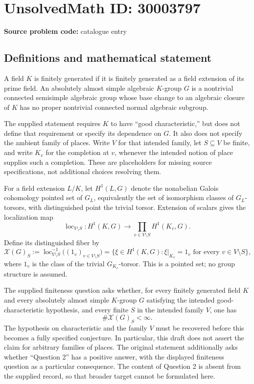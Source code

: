 \documentclass[11pt]{article}
\begin{document}
\section*{UnsolvedMath ID: 30003797}
\textbf{Source problem code:} catalogue entry
\subsection{Definitions and mathematical statement}
A field \(K\) is finitely generated if it is finitely generated as a field extension of its prime field. An absolutely almost simple algebraic \(K\)-group \(G\) is a nontrivial connected semisimple algebraic group whose base change to an algebraic closure of \(K\) has no proper nontrivial connected normal algebraic subgroup.

The supplied statement requires \(K\) to have ``good characteristic,'' but does not define that requirement or specify its dependence on \(G\). It also does not specify the ambient family of places. Write \(V\) for that intended family, let \(S\subseteq V\) be finite, and write \(K_v\) for the completion at \(v\), whenever the intended notion of place supplies such a completion. These are placeholders for missing source specifications, not additional choices resolving them.

For a field extension \(L/K\), let \(H^1(L,G)\) denote the nonabelian Galois cohomology pointed set of \(G_L\), equivalently the set of isomorphism classes of \(G_L\)-torsors, with distinguished point the trivial torsor. Extension of scalars gives the localization map
\[
\operatorname{loc}_{V\setminus S}\colon H^1(K,G)\longrightarrow\prod_{v\in V\setminus S}H^1(K_v,G).
\]
Define its distinguished fiber by
\[
\mathcal{X}(G)_S
:=\operatorname{loc}_{V\setminus S}^{-1}\bigl((1_v)_{v\in V\setminus S}\bigr)
=\bigl\{\xi\in H^1(K,G):\xi|_{K_v}=1_v\text{ for every }v\in V\setminus S\bigr\},
\]
where \(1_v\) is the class of the trivial \(G_{K_v}\)-torsor. This is a pointed set; no group structure is assumed.

The supplied finiteness question asks whether, for every finitely generated field \(K\) and every absolutely almost simple \(K\)-group \(G\) satisfying the intended good-characteristic hypothesis, and every finite \(S\) in the intended family \(V\), one has
\[
\#\mathcal{X}(G)_S<\infty.
\]
The hypothesis on characteristic and the family \(V\) must be recovered before this becomes a fully specified conjecture. In particular, this draft does not assert the claim for arbitrary families of places. The original statement additionally asks whether ``Question 2'' has a positive answer, with the displayed finiteness question as a particular consequence. The content of Question 2 is absent from the supplied record, so that broader target cannot be formulated here.
\end{document}
